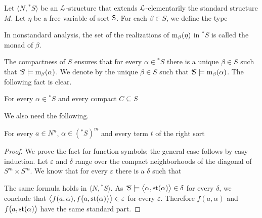 \documentclass{amsproc}
\renewcommand*{\emph}[1]{%
   \smash{\tikz[baseline]\node[rectangle, fill=teal!25, rounded corners, inner xsep=0.5ex, inner ysep=0.2ex, anchor=base, minimum height = 2.7ex]{\strut #1};}}
\begin{document}
Let $\langle N, {}^*\!\!S\rangle$ be an ${\EuScript L}$-structure that extends ${\EuScript L}$-elementarily the standard structure $M$. %
Let $\eta$ be a free variable of sort ${\sf S}$.
For each $\beta\in S$, we define the type


In nonstandard analysis, the set of the realizations of ${\rm m}_\beta(\eta)$ in ${}^*\!\!S$ is called the monad of $\beta$. 

The compactness of $S$ ensures that for every $\alpha\in{}^*\!\!S$ there is a unique $\beta\in S$ such that ${}^*\!\!S\models{\rm m}_\beta(\alpha)$.
We denote by \emph{${\rm st}(\alpha)$\/} the unique $\beta\in S$ such that ${}^*\!\!S\models{\rm m}_\beta(\alpha)$.
The following fact is clear.

\begin{fact}\label{fact_st1}
  For every $\alpha\in{}^*\! S$ and every compact $C\subseteq S$

\end{fact}


We also need the following.

\begin{lemma}\label{fact_terms_st}
  For every $a\in N^n$, $\alpha\in({}^*\!\!S)^m$ and every term $t$ of the right sort

\end{lemma}

\begin{proof}
  We prove the fact for function symbols; the general case follows by easy induction.
  Let $\varepsilon$ and $\delta$ range over the compact neighborhoods of the diagonal of $S^m\times S^m$.
  We know that for every $\varepsilon$ there is a $\delta$ such that 
  
  
  The same formula holds in $\langle N,{}^*\!\!S\rangle$.
  As ${}^*\!\!S\models\big\langle\alpha,{\rm st}(\alpha)\big\rangle\in\delta$ for every $\delta$, we conclude that $\big\langle f(a,\alpha),f\big(a,{\rm st}(\alpha)\big)\big\rangle\in\varepsilon$ for every $\varepsilon$.
  Therefore $f(a,\alpha)$ and $f\big(a,{\rm st}(\alpha)\big)$ have the same standard part.
\end{proof}
\end{document}
